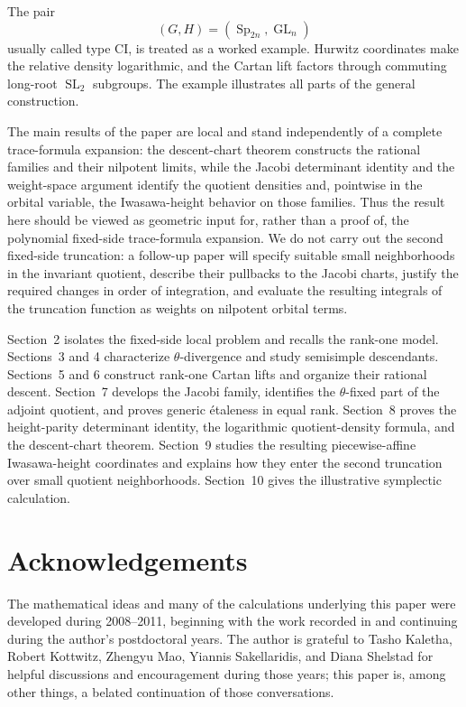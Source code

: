\documentclass[11pt]{amsart}
\theoremstyle{definition}
\theoremstyle{remark}
\newcommand{\GL}{\operatorname{GL}}
\newcommand{\SL}{\operatorname{SL}}
\newcommand{\Sp}{\operatorname{Sp}}
\begin{document}
The pair
\[
 (G,H)=(\Sp_{2n},\GL_n)
\]
usually called type CI, is treated as a worked example.  Hurwitz coordinates
make the relative density logarithmic, and the Cartan lift factors through
commuting long-root $\SL_2$ subgroups.  The example illustrates all parts of
the general construction.

The main results of the paper are local and stand independently of a complete
trace-formula expansion: the descent-chart theorem constructs the rational
families and their nilpotent limits, while the Jacobi determinant identity
and the weight-space argument identify the quotient densities and, pointwise
in the orbital variable, the Iwasawa-height behavior on those families.  Thus
the result here should be
viewed as geometric input for, rather than a proof of, the polynomial
fixed-side trace-formula expansion.  We do not carry out the second
fixed-side truncation: a follow-up paper will specify suitable small neighborhoods
in the invariant quotient, describe their pullbacks to the Jacobi charts,
justify the required changes in order of integration, and evaluate the
resulting integrals of the truncation function as weights on nilpotent orbital
terms.

Section~2 isolates the fixed-side local problem and recalls the rank-one
model.  Sections~3 and 4 characterize $\theta$-divergence and study
semisimple descendants.  Sections~5 and 6 construct rank-one Cartan lifts and
organize their rational descent.  Section~7 develops the Jacobi family,
identifies the $\theta$-fixed part of the adjoint quotient, and proves generic
\'etaleness in equal rank.  Section~8 proves the height-parity determinant
identity, the logarithmic quotient-density formula, and the descent-chart
theorem.  Section~9 studies the resulting piecewise-affine Iwasawa-height
coordinates and explains how they enter the second truncation over small
quotient neighborhoods.  Section~10 gives the illustrative symplectic
calculation.

\section*{Acknowledgements}

The mathematical ideas and many of the calculations underlying this paper were developed during 2008--2011, beginning with the work recorded in \cite{SparlingThesis} and continuing during the author's postdoctoral years.  The author is grateful to Tasho Kaletha, Robert Kottwitz, Zhengyu Mao, Yiannis Sakellaridis, and Diana Shelstad for helpful discussions and encouragement during those years; this paper is, among other things, a belated continuation of those conversations.
\end{document}
